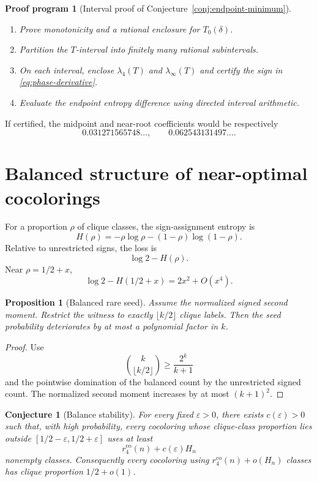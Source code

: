 \documentclass[11pt]{article}
\newtheorem{proposition}[theorem]{Proposition}
\newtheorem{conjecture}[theorem]{Conjecture}
\newtheorem{program}[theorem]{Proof program}
\theoremstyle{definition}
\newcommand{\rco}{r_4^{\mathrm{co}}}
\begin{document}
\begin{program}[Interval proof of Conjecture~\ref{conj:endpoint-minimum}]
\begin{enumerate}[label=(\roman*)]
\item Prove monotonicity and a rational enclosure for $T_0(\delta)$.
\item Partition the $T$-interval into finitely many rational subintervals.
\item On each interval, enclose $\lambda_4(T)$ and
$\lambda_\infty(T)$ and certify the sign in
\eqref{eq:phase-derivative}.
\item Evaluate the endpoint entropy difference using directed interval
arithmetic.
\end{enumerate}
\end{program}

If certified, the midpoint and near-root coefficients would be respectively
\[
 0.031271565748\ldots,
 \qquad
 0.062543131497\ldots.
\]

\section{Balanced structure of near-optimal cocolorings}

For a proportion $\rho$ of clique classes, the sign-assignment entropy is
\[
 H(\rho)=-\rho\log\rho-(1-\rho)\log(1-\rho).
\]
Relative to unrestricted signs, the loss is
\[
 \log2-H(\rho).
\]
Near $\rho=1/2+x$,
\[
 \log2-H(1/2+x)=2x^2+O(x^4).
\]

\begin{proposition}[Balanced rare seed]
Assume the normalized signed second moment.  Restrict the witness to exactly
$\lfloor k/2\rfloor$ clique labels.  Then the seed probability deteriorates by
at most a polynomial factor in $k$.
\end{proposition}

\begin{proof}
Use
\[
 \binom{k}{\lfloor k/2\rfloor}\ge\frac{2^k}{k+1}
\]
and the pointwise domination of the balanced count by the unrestricted signed
count.  The normalized second moment increases by at most $(k+1)^2$.
\end{proof}

\begin{conjecture}[Balance stability]
\label{conj:balance}
For every fixed $\varepsilon>0$, there exists $c(\varepsilon)>0$ such that,
with high probability, every cocoloring whose clique-class proportion lies
outside $[1/2-\varepsilon,1/2+\varepsilon]$ uses at least
\[
 \rco(n)+c(\varepsilon)H_n
\]
nonempty classes.  Consequently every cocoloring using
$\rco(n)+o(H_n)$ classes has clique proportion $1/2+o(1)$.
\end{conjecture}
\end{document}
